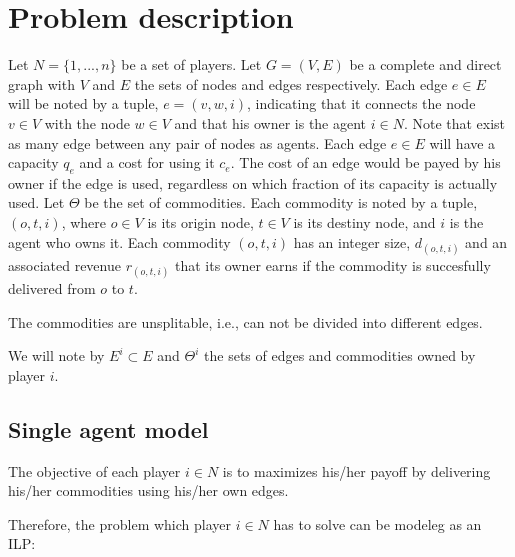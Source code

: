 \documentclass{article}
\begin{document}
\section{Problem description}

Let $N=\{1,...,n\}$ be a set of players. Let $G=(V,E)$ be a complete and direct graph with $V$ and $E$ the sets
of nodes and edges respectively. Each edge $e \in E$ will be noted by a tuple, $e=(v,w,i)$, indicating that it 
connects the node $v\in V$ with the node $w \in V$ and that his owner is the agent $i\in N$. Note that exist as
many edge between any pair of nodes as agents. Each edge $e \in E$ will have a capacity $q_e$ and a cost for using it $c_e$.
The cost of an edge would be payed by his owner if the edge is used, regardless on which fraction of its capacity
is actually used. Let $\Theta$ be the set of commodities. Each commodity is noted by a tuple, $(o,t,i)$, where $o\in V$ is its origin
node, $t\in V$ is its destiny node, and $i$ is the agent who owns it. Each commodity $(o,t,i)$ has an integer size, $d_{(o,t,i)}$
and an associated revenue $r_{(o,t,i)}$ that its owner earns if the commodity is succesfully delivered from $o$ to $t$.

The commodities are unsplitable, i.e., can not be divided into different edges.

We will note by $E^i \subset E$ and $\Theta^i$ the sets of edges and commodities owned by player $i$.


\subsection{Single agent model}

The objective of each player $i \in N$ is to maximizes his/her payoff by delivering his/her commodities using 
his/her own edges.

Therefore, the problem which player $i\in N$ has to solve can be modeleg as an ILP:
\end{document}
